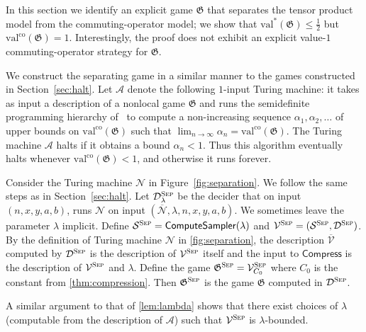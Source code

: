 \documentclass[11pt]{article}
\theoremstyle{definition}
\newcommand{\val}{\ensuremath{\mathrm{val}}}
\newcommand{\valco}{\ensuremath{\mathrm{val}^{\mathrm{co}}}}
\newcommand{\desc}[1]{\overline{\cal{#1}}}
\newcommand{\game}{\mathfrak{G}}
\newcommand{\sampler}{\mathcal{S}}
\newcommand{\decider}{\mathcal{D}}
\newcommand{\verifier}{\mathcal{V}}
\newcommand{\gamestyle}[1]{\ensuremath{\textsc{#1}}\xspace}
\renewcommand{\cal}[1]{\mathcal{#1}}
\newcommand{\tmstyle}[1]{\ensuremath{\mathsf{#1}}}
\newcommand{\Compress}{\tmstyle{Compress}}
\newcommand{\ComputeSampler}{\tmstyle{ComputeSampler}}
\newcommand{\sep}{\gamestyle{Sep}}
\begin{document}
In this section we identify an explicit game $\game$ that separates the tensor
product model from the commuting-operator model; we show that $\val^*(\game)
\leq \frac{1}{2}$ but $\valco(\game) = 1$.
Interestingly, the proof does not exhibit an explicit value-$1$
commuting-operator strategy for $\game$.

We construct the separating game in a similar manner to the games constructed in
Section~\ref{sec:halt}.
Let $\cal{A}$ denote the following $1$-input Turing machine: it takes as input a
description of a nonlocal game $\game$ and runs the semidefinite programming
hierarchy of~\cite{navascues2008convergent,doherty2008quantum} to compute a
non-increasing sequence $\alpha_1,\alpha_2,\ldots$ of upper bounds on
$\valco(\game)$ such that $\lim_{n \to \infty} \alpha_n = \valco(\game)$.
The Turing machine $\cal{A}$ halts if it obtains a bound $\alpha_n < 1$.
Thus this algorithm eventually halts whenever $\valco(\game) < 1$, and
otherwise it runs forever.

Consider the Turing machine $\cal{N}$ in Figure~\ref{fig:separation}.
We follow the same steps as in Section~\ref{sec:halt}.
Let $\decider^\sep_\lambda$ be the decider that on input $(n, x, y, a, b)$,
runs $\cal{N}$ on input $(\desc{\cal{N}}, \lambda, n, x, y, a, b)$. We
sometimes leave the parameter $\lambda$ implicit.
Define $\sampler^\sep = \ComputeSampler(\lambda)$ and $\verifier^\sep =
(\sampler^\sep, \decider^\sep)$. By the definition of Turing machine $\cal{N}$
in \cref{fig:separation}, the description $\overline{\verifier}$ computed by
$\decider^\sep$ is the description of $\verifier^\sep$ itself and the input to
$\Compress$ is the description of $\verifier^\sep$ and $\lambda$.
Define the game $\game^\sep = \verifier^\sep_{C_0}$ where $C_0$ is the constant
from \cref{thm:compression}.
Then $\game^\sep$ is the game $\game$ computed in $\decider^\sep$.

A similar argument to that of \cref{lem:lambda} shows that there exist choices
of $\lambda$ (computable from the description of $\cal{A}$) such that
$\verifier^\sep$ is $\lambda$-bounded.
\end{document}
